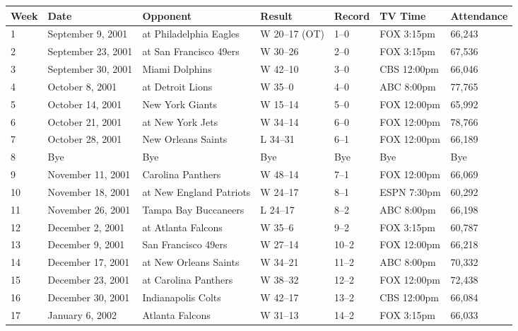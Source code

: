 \documentclass{article}
\begin{document}
\begin{tabular}{lllllll}
\toprule
Week & Date & Opponent & Result & Record & TV Time & Attendance \\
\midrule
1 & September 9, 2001 & at Philadelphia Eagles & W 20–17 (OT) & 1–0 & FOX 3:15pm & 66,243 \\
2 & September 23, 2001 & at San Francisco 49ers & W 30–26 & 2–0 & FOX 3:15pm & 67,536 \\
3 & September 30, 2001 & Miami Dolphins & W 42–10 & 3–0 & CBS 12:00pm & 66,046 \\
4 & October 8, 2001 & at Detroit Lions & W 35–0 & 4–0 & ABC 8:00pm & 77,765 \\
5 & October 14, 2001 & New York Giants & W 15–14 & 5–0 & FOX 12:00pm & 65,992 \\
6 & October 21, 2001 & at New York Jets & W 34–14 & 6–0 & FOX 12:00pm & 78,766 \\
7 & October 28, 2001 & New Orleans Saints & L 34–31 & 6–1 & FOX 12:00pm & 66,189 \\
8 & Bye & Bye & Bye & Bye & Bye & Bye \\
9 & November 11, 2001 & Carolina Panthers & W 48–14 & 7–1 & FOX 12:00pm & 66,069 \\
10 & November 18, 2001 & at New England Patriots & W 24–17 & 8–1 & ESPN 7:30pm & 60,292 \\
11 & November 26, 2001 & Tampa Bay Buccaneers & L 24–17 & 8–2 & ABC 8:00pm & 66,198 \\
12 & December 2, 2001 & at Atlanta Falcons & W 35–6 & 9–2 & FOX 3:15pm & 60,787 \\
13 & December 9, 2001 & San Francisco 49ers & W 27–14 & 10–2 & FOX 12:00pm & 66,218 \\
14 & December 17, 2001 & at New Orleans Saints & W 34–21 & 11–2 & ABC 8:00pm & 70,332 \\
15 & December 23, 2001 & at Carolina Panthers & W 38–32 & 12–2 & FOX 12:00pm & 72,438 \\
16 & December 30, 2001 & Indianapolis Colts & W 42–17 & 13–2 & CBS 12:00pm & 66,084 \\
17 & January 6, 2002 & Atlanta Falcons & W 31–13 & 14–2 & FOX 3:15pm & 66,033 \\
\bottomrule
\end{tabular}
\end{document}
